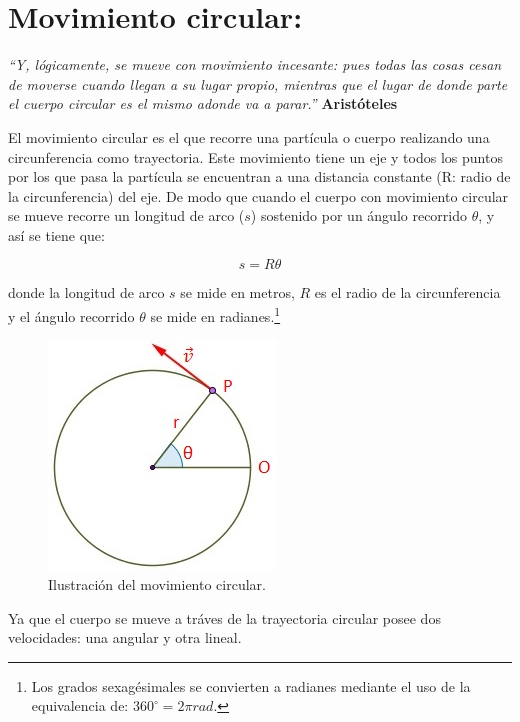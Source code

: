\chapter{Movimiento circular:}

\textit{``Y, lógicamente, se mueve con movimiento incesante: pues todas las cosas cesan de moverse cuando llegan a su lugar 
propio, mientras que el lugar de donde parte el cuerpo circular es el mismo adonde va a parar.''} \textbf{Aristóteles}
\vspace{1.0cm}

El movimiento circular es el que recorre una partícula o cuerpo realizando una circunferencia como trayectoria. Este movimiento 
tiene un eje y todos los puntos por los que pasa la partícula se encuentran a una distancia constante (R: radio de la 
circunferencia) del eje. De modo que cuando el cuerpo con movimiento circular se mueve recorre un longitud de arco ($s$) 
sostenido por un ángulo recorrido $\theta$, y así se tiene que:

\begin{equation}
 s = R\theta
\end{equation}

donde la longitud de arco $s$ se mide en metros, $R$ es el radio de la circunferencia y el ángulo recorrido $\theta$ se mide en 
radianes.\footnote{Los grados sexagésimales se convierten a radianes mediante el uso de la equivalencia de: $360^\circ = 2\pi 
rad$.}

\begin{figure}[ht]
 \centering
 \includegraphics[scale=0.6]{images/movimiento-circular.jpg}
 \caption{Ilustración del movimiento circular.}\label{circular}
\end{figure}   

Ya que el cuerpo se mueve a tráves de la trayectoria circular posee dos velocidades: una angular y otra lineal.\\

